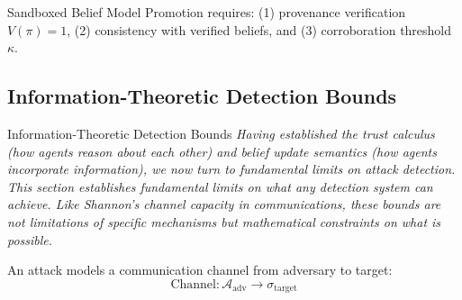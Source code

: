 \documentclass[
  ignorenonframetext,
]{beamer}
\begin{document}
\begin{frame}[allowframebreaks]{Sandboxed Belief Model}
Promotion requires: (1) provenance verification \(V(\pi) = 1\), (2)
consistency with verified beliefs, and (3) corroboration threshold
\(\kappa\).
\end{frame}

\subsection{Information-Theoretic Detection
Bounds}\label{sec:detection-bounds}

\begin{frame}[allowframebreaks]{Information-Theoretic Detection Bounds}
\emph{Having established the trust calculus (how agents reason about
each other) and belief update semantics (how agents incorporate
information), we now turn to fundamental limits on attack detection.
This section establishes fundamental limits on what any detection system
can achieve. Like Shannon's channel capacity in communications, these
bounds are not limitations of specific mechanisms but mathematical
constraints on what is possible.}

\begin{definition}
\label{def:attack-channel}
An attack models a communication channel from adversary to target:
\begin{equation}
\label{eq:attack-channel}
\text{Channel}: \mathcal{A}_{\text{adv}} \to \sigma_{\text{target}}
\end{equation}
\end{definition}

\end{frame}
\end{document}

